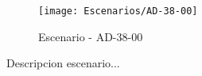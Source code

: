 \begin{figure}[H]
\centering
\texttt{[image: Escenarios/AD-38-00]}
\caption{Escenario - AD-38-00}
\label{fig:AD-38-00}
\end{figure}

Descripcion escenario...
\clearpage
